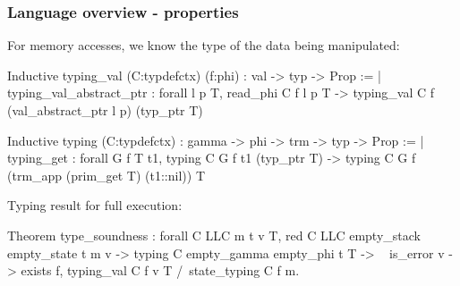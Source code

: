 \begin{frame}[fragile]
\frametitle{Language overview - properties}

For memory accesses, we know the type of the data being manipulated:
\begin{coqs}
Inductive typing_val (C:typdefctx) (f:phi) : val -> typ -> Prop :=
  | typing_val_abstract_ptr : forall l p T,
      read_phi C f l p T ->
      typing_val C f (val_abstract_ptr l p) (typ_ptr T)

Inductive typing (C:typdefctx) : gamma -> phi -> trm -> typ -> Prop :=
  | typing_get : forall G f T t1,
      typing C G f t1 (typ_ptr T) ->
      typing C G f (trm_app (prim_get T) (t1::nil)) T
\end{coqs}

\bigskip

Typing result for full execution:
\begin{coqs}
  Theorem type_soundness : forall C LLC m t v T,
    red C LLC empty_stack empty_state t m v ->
    typing C empty_gamma empty_phi t T ->
    ~ is_error v ->
    exists f, typing_val C f v T 
  	  /\  state_typing C f m.
\end{coqs}

\end{frame}


